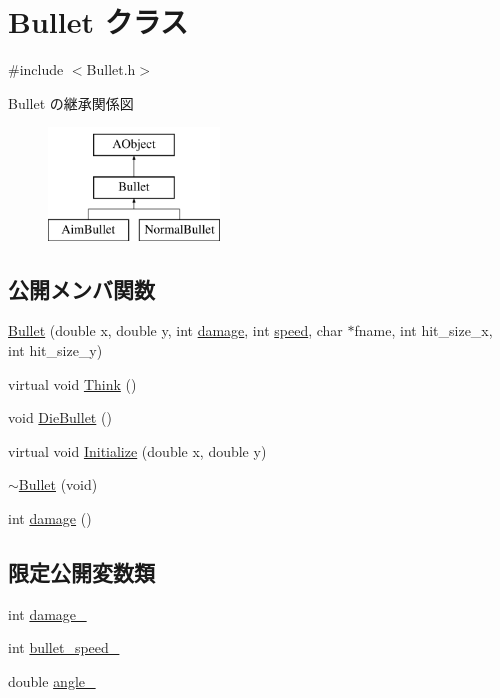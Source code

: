 \hypertarget{class_bullet}{\section{Bullet クラス}
\label{class_bullet}
}


{\ttfamily \#include $<$Bullet.\+h$>$}

Bullet の継承関係図\begin{figure}[H]
\begin{center}
\leavevmode
\includegraphics[height=3.000000cm]{class_bullet}
\end{center}
\end{figure}
\subsection*{公開メンバ関数}
\begin{DoxyCompactItemize}
\item 
\hyperlink{class_bullet_a62798f15ff62617a274c12ad1ffb9aad}{Bullet} (double x, double y, int \hyperlink{class_bullet_a6e5b78574ec8fbff411b1319cf111799}{damage}, int \hyperlink{class_a_object_abb924b7e558a2f9d86f2db2bc2fb18a4}{speed}, char $\ast$fname, int hit\+\_\+size\+\_\+x, int hit\+\_\+size\+\_\+y)
\item 
virtual void \hyperlink{class_bullet_a0f3207f4dc7244fd3510b89943f939f3}{Think} ()
\item 
void \hyperlink{class_bullet_a67b44c96157279508e92f9dc91419f38}{Die\+Bullet} ()
\item 
virtual void \hyperlink{class_bullet_a4c20c48e68e8b14c9df456c50f61998d}{Initialize} (double x, double y)
\item 
\hyperlink{class_bullet_ab3c2b9c0b12c18aeace52bd289ddfce3}{$\sim$\+Bullet} (void)
\item 
int \hyperlink{class_bullet_a6e5b78574ec8fbff411b1319cf111799}{damage} ()
\end{DoxyCompactItemize}
\subsection*{限定公開変数類}
\begin{DoxyCompactItemize}
\item 
int \hyperlink{class_bullet_aaa26f3bff8a6f418831cf7458e018b40}{damage\+\_\+}
\item 
int \hyperlink{class_bullet_aff48665a8060391eaca9bb2d38b8492f}{bullet\+\_\+speed\+\_\+}
\item 
double \hyperlink{class_bullet_a70eee9d25fde596eb251251e3806a6cc}{angle\+\_\+}
\end{DoxyCompactItemize}

